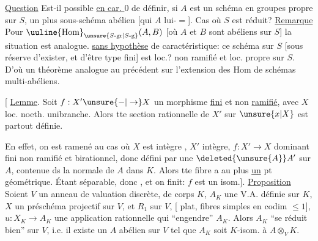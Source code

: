 \uline{Question}  Est-il possible \uline{en car. $0$} de définir, si
$A$ est un  schéma en groupes propre sur $S$,
un plus  sous-schéma abélien [qui
    $A$ lui-$=$]. Cas
où $S$ est réduit?
\uline{Remarque} Pour $\uuline{\mathrm{Hom}}_{\unsure{S\text{-gr}|S\text{-g}}}(A,B)$ [où $A$ et $B$
sont \unsure{]|?}abéliens sur $S$] la situation est analogue.
\uline{sans hypothèse} de  caractéristique:
ce schéma sur $S$ [sous réserve d'exister,
et d'être   type fini] est
loc.? non ramifié et loc. propre sur $S$. D'où
un théorème analogue au précédent sur
l'extension des Hom de schémas multi-abéliens.

[ \uline{Lemme}. Soit $f:X'\unsure{-|\to}X$ un morphisme \uline{fini}
et non \uline{ramifié}, avec $X$  loc. noeth.
unibranche. Alors tte section rationnelle de
$X'$ sur $\unsure{x|X}$ est partout définie.

En effet, on est ramené au cas où
 $X$ est intègre , $X'$ intègre, $f:X'\to X$ dominant
fini non ramifié et birationnel, donc
défini par une  $\deleted{\unsure{A}}A'$ sur $A$,
contenue ds la  normale de $A$ dans $K$.
 Alors tte fibre a au plus \uline{un}
pt géométrique. Étant séparable, 
donc , et on finit: $f$ est un isom.].
\uline{Proposition} Soient $V$ un anneau de valuation discrète,
de corps $K$, $A_K$ une V.A. définie sur $K$,
$X$ un préschéma projectif sur $V$, et $R_1$ sur $V$,
[ plat, fibres simples en codim $\leq 1$],
$u:X_K\to A_K$ une application rationnelle qui
``engendre'' $A_K$. Alors $A_K$ ``se réduit bien''
sur $V$, i.e. il existe un $A$ abélien sur
$V$ tel que $A_K$ soit $K$-isom. à $A\otimes_V K$.

